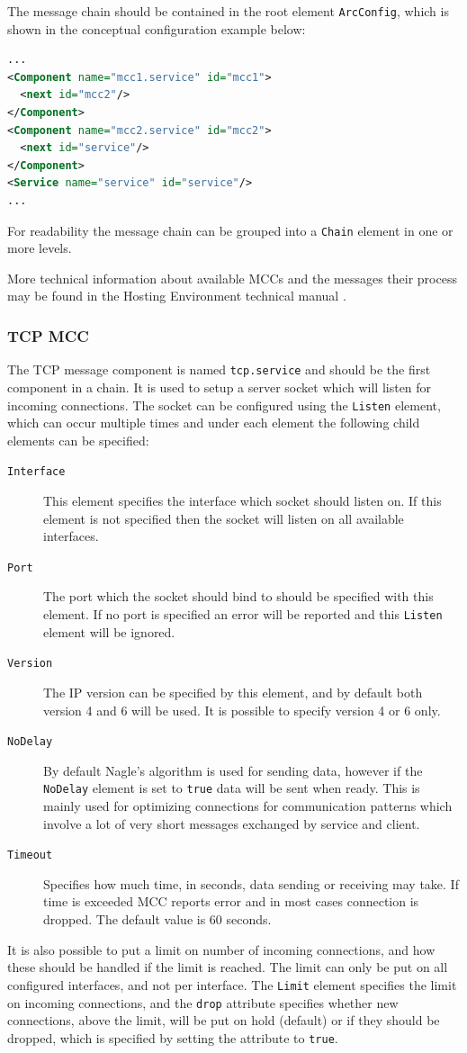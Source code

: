 \documentclass{article}
\begin{document}
The message chain should be contained in the root element \texttt{ArcConfig},
which is shown in the conceptual configuration example below:
\begin{lstlisting}[language=xml]
...
<Component name="mcc1.service" id="mcc1">
  <next id="mcc2"/>
</Component>
<Component name="mcc2.service" id="mcc2">
  <next id="service"/>
</Component>
<Service name="service" id="service"/>
...
\end{lstlisting}
For readability the message chain can be grouped into a \texttt{Chain} element
in one or more levels.

More technical information about available MCCs and the messages their process
may be found in the Hosting Environment technical manual \cite{hed}.

\subsubsection{TCP MCC}\label{sec:tcp-mcc}
The TCP message component is named \texttt{tcp.service} and should be the first
component in a chain. It is used to setup a server socket which will listen for
incoming connections. The socket can be configured using the \texttt{Listen}
element, which can occur multiple times and under each element the following
child elements can be specified:
\begin{description}
\item[\texttt{Interface}] This element specifies the interface which socket
  should listen on. If this element is not specified then the socket will listen
  on all available interfaces.
\item[\texttt{Port}] The port which the socket should bind to should be
  specified with this element. If no port is specified an error will be reported
  and this \texttt{Listen} element will be ignored.
\item[\texttt{Version}] The IP version can be specified by this element, and by
  default both version 4 and 6 will be used. It is possible to specify version 4
  or 6 only.
\item[\texttt{NoDelay}] By default Nagle's algorithm is used for sending data,
  however if the \texttt{NoDelay} element is set to \texttt{true} data will be
  sent when ready. This is mainly used for optimizing connections for communication
  patterns which involve a lot of very short messages exchanged by service
  and client.
\item[\texttt{Timeout}] Specifies how much time, in seconds, data sending or
  receiving may take. If time is exceeded MCC reports error and in most cases
  connection is dropped. The default value is 60 seconds.
\end{description}
It is also possible to put a limit on number of incoming connections, and how
these should be handled if the limit is reached. The limit can only be put on all
configured interfaces, and not per interface. The \texttt{Limit} element specifies
the limit on incoming connections, and the \texttt{drop} attribute specifies whether
new connections, above the limit, will be put on hold (default) or if they should
be dropped, which is specified by setting the attribute to \texttt{true}.
\end{document}
